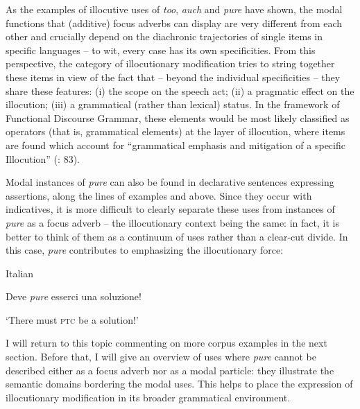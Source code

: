 As the examples of illocutive uses of \textit{too}, \textit{auch} and \textit{pure} have shown, the modal functions that (additive) focus adverbs can display are very different from each other and crucially depend on the diachronic trajectories of single items in specific languages – to wit, every case has its own specificities. From this perspective, the category of illocutionary modification tries to string together these items in view of the fact that – beyond the individual specificities – they share these features: (i) the scope on the speech act; (ii) a pragmatic effect on the illocution; (iii) a grammatical (rather than lexical) status. In the framework of Functional Discourse Grammar, these elements would be most likely classified as operators (that is, grammatical elements) at the layer of illocution, where items are found which account for “grammatical emphasis and mitigation of a specific Illocution” (\citealt{HengeveldMackenzie2008}: 83).

Modal instances of \textit{pure} can also be found in declarative sentences expressing assertions, along the lines of examples  and  above. Since they occur with indicatives, it is more difficult to clearly separate these uses from instances of \textit{pure} as a focus adverb – the illocutionary context being the same: in fact, it is better to think of them as a continuum of uses rather than a clear-cut divide. In this case, \textit{pure} contributes to emphasizing the illocutionary force:

\ea%
    \label{ex:key:24}

          Italian

Deve \textit{pure} esserci una soluzione!

\glt ‘There must \textsc{ptc} be a solution!’
    \z

I will return to this topic commenting on more corpus examples in the next section. Before that, I will give an overview of uses where \textit{pure} cannot be described either as a focus adverb nor as a modal particle: they illustrate the semantic domains bordering the modal uses. This helps to place the expression of illocutionary modification in its broader grammatical environment.

